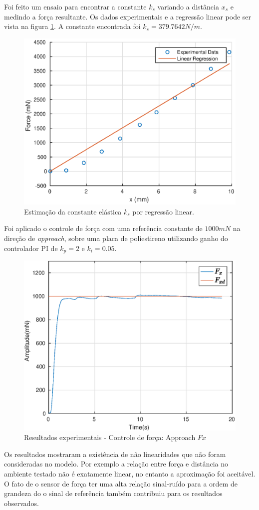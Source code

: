 Foi feito um ensaio para encontrar a constante $k_s$ variando a distância $x_s$ e medindo a força resultante. Os dados experimentais e a regressão linear pode ser vista na figura \ref{fig:ks_linreg}. A constante encontrada foi $k_s = 379.7642 N/m$.

\begin{figure}[!ht]
\centering
  \includegraphics[width=0.5\linewidth]{./img/ks_estimation.eps}
  \caption{Estimação da constante elástica $k_s$ por regressão linear.}
  \label{fig:ks_linreg}
\end{figure}%

Foi aplicado o controle de força com uma referência constante de $1000 mN$ na direção de \textit{approach}, sobre uma placa de poliestireno utilizando ganho do controlador PI de $k_p = 2$ e $k_i = 0.05$. 

 \begin{figure}[H]
  \centering
  \includegraphics[width=0.5\linewidth]{./img/force1000_kp2_ki005/Fx.eps}
  \caption{Resultados experimentais - Controle de força: Approach $Fx$}
  \label{fig:force_approach}
\end{figure}

Os resultados mostraram a existência de não linearidades que não foram consideradas no modelo. Por exemplo a relação entre força e distância no ambiente testado não é exatamente linear, no entanto a aproximação foi aceitável. O fato de o sensor de força ter uma alta relação sinal-ruído para a ordem de grandeza do o sinal de referência também contribuiu para os resultados observados. 

